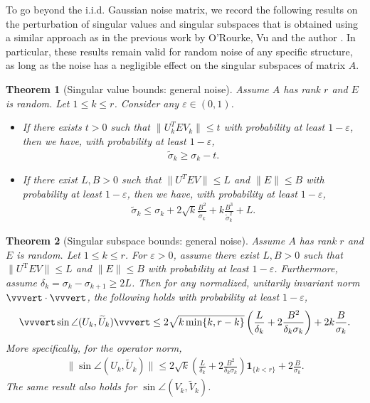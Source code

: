 \documentclass[reqno]{amsart}
\newcommand{\T}{\mathrm{T}}
\theoremstyle{plain}
\newtheorem{theorem}{Theorem}
\theoremstyle{definition}
\begin{document}
To go beyond the i.i.d. Gaussian noise matrix, we record the following results on the perturbation of singular values and singular subspaces that is obtained using a similar approach as in the previous work by O'Rourke, Vu and the author \cite{OVW2}. In particular, these results remain valid for random noise of any specific structure, as long as the noise has a negligible effect on the singular subspaces of matrix $A$.
\begin{theorem}[Singular value bounds: general noise]\label{thm:general-sv}
Assume $A$ has rank $r$ and $E$ is random. Let $1\le k \le r$. Consider any $\varepsilon\in (0,1)$.
\begin{itemize}
\item If there exists $t>0$ such that  $\|U_k^T E V_k\| \le t$ with probability at least $1-\varepsilon$, then we have, with probability at least $1-\varepsilon$,
\begin{align}\label{eq:lowerbd}
\widetilde \sigma_k \ge \sigma_k - t.
\end{align}
\item If there exist $L, B>0$ such that $\|U^T E V\| \le L$ and $\|E\| \le B$ with probability at least $1-\varepsilon$, then we have, with probability at least $1-\varepsilon$,
\begin{align}\label{eq:upperbd}
\widetilde \sigma_k \le \sigma_k + 2\sqrt{k} \frac{B^2}{\widetilde \sigma_k} + k \frac{B^3}{\widetilde \sigma_k^2} + L.
\end{align}
\end{itemize}
\end{theorem}
\begin{theorem}[Singular subspace bounds: general noise]\label{thm:generalnoise} Assume $A$ has rank $r$ and $E$ is random. Let $1\le k \le r$. For  $\varepsilon>0$, assume there exist $L,B>0$ such that $\|U^\T E V\| \le L$ and $\|E\| \le B$ with probability at least $1-\varepsilon$. Furthermore, assume $\delta_k=\sigma_k-\sigma_{k+1}\ge 2L$. Then for any normalized, unitarily invariant norm $\vvvert \cdot \vvvert$, the following holds with probability at least $1-\varepsilon$,
\begin{align*}
\vvvert \sin\angle (U_k, \widetilde U_k) \vvvert \le 2 \sqrt{k \min\{k,r-k \}} \left(\frac{L }{\delta_k} + 2\frac{B^2}{\delta_k \sigma_k} \right) +2 k\frac{ B }{ \sigma_k}.
\end{align*}
More specifically, for the operator norm, 
\begin{align*}
\| \sin\angle (U_k, \widetilde U_k) \| \le 2 \sqrt{k} \left(\frac{L }{\delta_k} + 2\frac{B^2}{\delta_k \sigma_k} \right)\mathbf{1}_{\{ k< r\}} + 2 \frac{B}{\sigma_k}.
\end{align*}
The same result also holds for $\sin\angle (V_k, \widetilde V_k)$.
\end{theorem}
\end{document}
